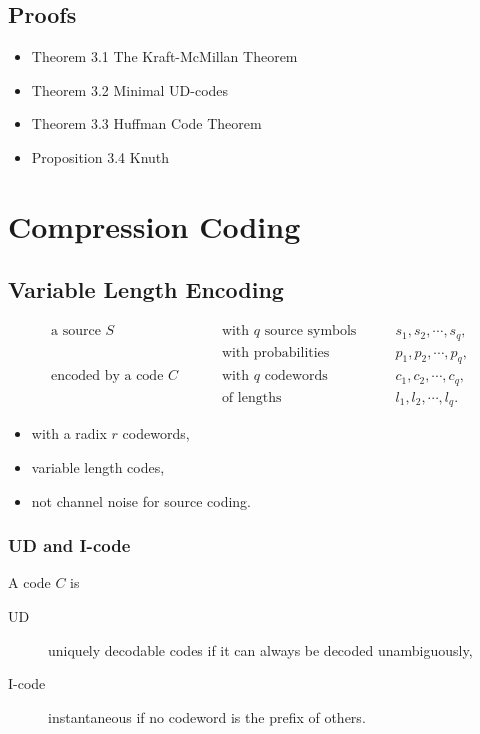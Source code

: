 \documentclass{article}
\begin{document}
\subsection{Proofs}

\begin{itemize}
    \item Theorem 3.1 The Kraft-McMillan Theorem
    \item Theorem 3.2 Minimal UD-codes
    \item Theorem 3.3 Huffman Code Theorem
    \item Proposition 3.4 Knuth
\end{itemize}

\newpage

\setcounter{section}{2}

\section{Compression Coding}

\subsection{Variable Length Encoding}

\begin{align*}
    \text{a source } S \qquad &\text{ with } q \text{ source symbols} \qquad & s_{1},s_{2},\cdots,s_{q},\\
    &\text{ with probabilities} \qquad &  p_{1},p_{2},\cdots,p_{q},\\
    \text{encoded by a code } C \qquad &\text{ with } q \text{ codewords} \qquad & c_{1},c_{2},\cdots,c_{q},\\
    &\text{ of lengths} \qquad & l_{1},l_{2},\cdots,l_{q}.
\end{align*}

\begin{itemize}
    \item with a radix $r$ codewords,
    \item variable length codes,
    \item not channel noise for source coding.
\end{itemize}

\subsubsection{UD and I-code}

A code $C$ is

\begin{description}
    \item[UD] uniquely decodable codes if it can always be decoded unambiguously,
    \item[I-code] instantaneous if no codeword is the prefix of others.
\end{description}
\end{document}
